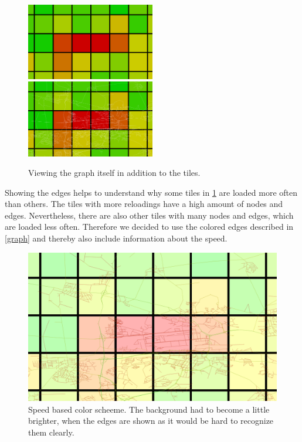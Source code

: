 \documentclass
[
    paper = a4,
    pagesize,
    12 pt,
    oneside,                       %
    open = right,
    DIV = calc,
    BCOR = 0 mm,                   %
    bibtotoc
]
{scrbook}
\begin{document}
\begin{figure}[H]
    \includegraphics[width=0.5\textwidth]{Images/vis-edges-no.png}
    \includegraphics[width=0.5\textwidth]{Images/vis-edges-white.png}
\caption[]{Viewing the graph itself in addition to the tiles.}
\label{fig:white edges}
\end{figure}

Showing the edges helps to understand why some tiles in \cref{fig:white edges} are loaded more often than others.
The tiles with more reloadings have a high amount of nodes and edges.
Nevertheless, there are also other tiles with many nodes and edges, which are loaded less often.
Therefore we decided to use the colored edges described in \cref{graph} and thereby also include information about the speed.

\begin{figure}[H]
    \includegraphics[width=\textwidth]{Images/vis-edges-hsv.png}
\caption[]{Speed based color scheeme. The background had to become a little brighter, when the edges are shown as it would be hard to recognize them clearly. }
\label{fig:colored edges}
\end{figure}
\end{document}
